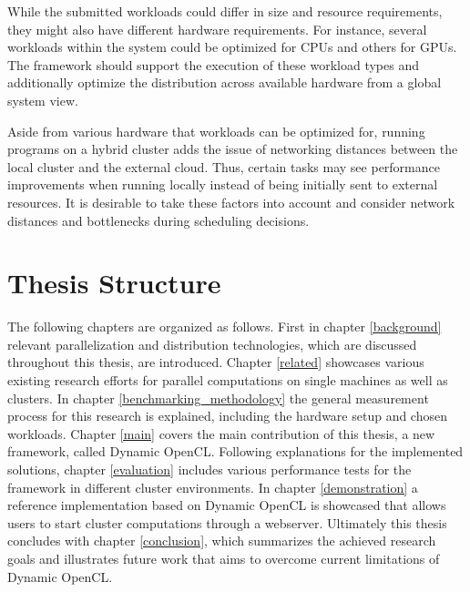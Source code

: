 \begin{description}[style=nextline]
    \item [Workload Diversity]
    While the submitted workloads could differ in size and resource requirements, they might also have different hardware requirements. For instance, several workloads within the system could be optimized for CPUs and others for GPUs. The framework should support the execution of these workload types and additionally optimize the distribution across available hardware from a global system view.

    \item [Optimized Scheduling]
    Aside from various hardware that workloads can be optimized for, running programs on a hybrid cluster adds the issue of networking distances between the local cluster and the external cloud. Thus, certain tasks may see performance improvements when running locally instead of being initially sent to external resources. It is desirable to take these factors into account and consider network distances and bottlenecks during scheduling decisions.

\end{description}


\section*{Thesis Structure}
\label{structure}

The following chapters are organized as follows. First in chapter \ref{background} relevant parallelization and distribution technologies, which are discussed throughout this thesis, are introduced. Chapter \ref{related} showcases various existing research efforts for parallel computations on single machines as well as clusters. In chapter \ref{benchmarking_methodology} the general measurement process for this research is explained, including the hardware setup and chosen workloads. Chapter \ref{main} covers the main contribution of this thesis, a new framework, called Dynamic OpenCL. Following explanations for the implemented solutions, chapter \ref{evaluation} includes various performance tests for the framework in different cluster environments. In chapter \ref{demonstration} a reference implementation based on Dynamic OpenCL is showcased that allows users to start cluster computations through a webserver. Ultimately this thesis concludes with chapter \ref{conclusion}, which summarizes the achieved research goals and illustrates future work that aims to overcome current limitations of Dynamic OpenCL.
